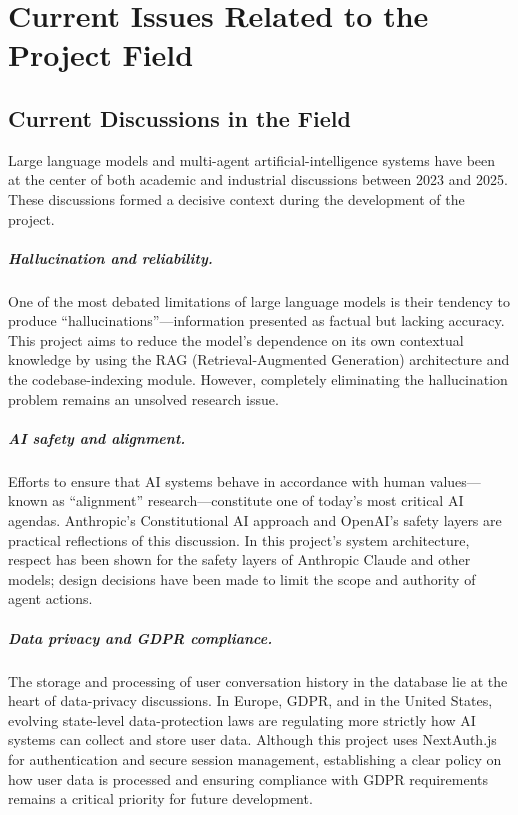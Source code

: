 \documentclass[11pt,a4paper]{report}
\begin{document}
\chapter{Current Issues Related to the Project Field}

\section{Current Discussions in the Field}

Large language models and multi-agent artificial-intelligence systems have
been at the center of both academic and industrial discussions between 2023
and 2025. These discussions formed a decisive context during the development
of the project.

\paragraph{Hallucination and reliability.}
One of the most debated limitations of large language models is their
tendency to produce ``hallucinations''---information presented as factual but
lacking accuracy. This project aims to reduce the model's dependence on its
own contextual knowledge by using the RAG (Retrieval-Augmented Generation)
architecture and the codebase-indexing module. However, completely
eliminating the hallucination problem remains an unsolved research issue.

\paragraph{AI safety and alignment.}
Efforts to ensure that AI systems behave in accordance with human values---
known as ``alignment'' research---constitute one of today's most critical AI
agendas. Anthropic's Constitutional AI approach and OpenAI's safety layers
are practical reflections of this discussion. In this project's system
architecture, respect has been shown for the safety layers of Anthropic
Claude and other models; design decisions have been made to limit the scope
and authority of agent actions.

\paragraph{Data privacy and GDPR compliance.}
The storage and processing of user conversation history in the database lie
at the heart of data-privacy discussions. In Europe, GDPR, and in the United
States, evolving state-level data-protection laws are regulating more
strictly how AI systems can collect and store user data. Although this
project uses NextAuth.js for authentication and secure session management,
establishing a clear policy on how user data is processed and ensuring
compliance with GDPR requirements remains a critical priority for future
development.
\end{document}
